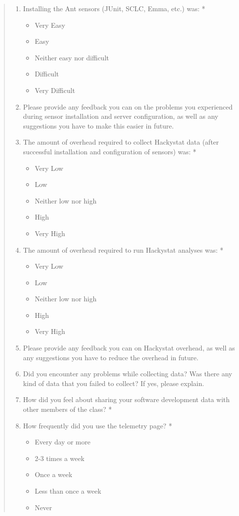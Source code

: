 \begin{quote}
\begin{enumerate}
\item Installing the Ant sensors (JUnit, SCLC, Emma, etc.) was: *
\begin{itemize}
\item Very Easy
\item Easy
\item Neither easy nor difficult
\item Difficult
\item Very Difficult
\end{itemize}

\item Please provide any feedback you can on the problems you experienced during sensor installation and server configuration, as well as any suggestions you have to make this easier in future.

\item The amount of overhead required to collect Hackystat data (after successful installation and configuration of sensors) was: *
\begin{itemize}
\item Very Low
\item Low
\item Neither low nor high
\item High
\item Very High
\end{itemize}

\item The amount of overhead required to run Hackystat analyses was: *
\begin{itemize}
\item Very Low
\item Low
\item Neither low nor high
\item High
\item Very High
\end{itemize}

\item Please provide any feedback you can on Hackystat overhead, as well as any suggestions you have to reduce the overhead in future.

\item Did you encounter any problems while collecting data? Was there any kind of data that you failed to collect? If yes, please explain.

\item How did you feel about sharing your software development data with other members of the class? *

\item How frequently did you use the telemetry page? *
\begin{itemize}
\item Every day or more
\item 2-3 times a week
\item Once a week
\item Less than once a week
\item Never
\end{itemize}


\end{enumerate}
\end{quote}
